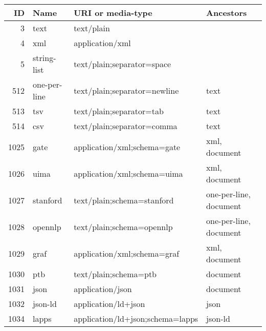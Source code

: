\begin{longtable}{| r | l | l | p{3cm} | }
\hline \multicolumn{1}{|r|}{\textbf{ID}} & \multicolumn{1}{l|}{\textbf{Name}} & \multicolumn{1}{l|}{\textbf{URI or media-type}} & \multicolumn{1}{l|}{\textbf{Ancestors}} \\ \hline
\endhead

3 & text & text/plain &  \\ \hline
4 & xml & application/xml &  \\ \hline
5 & string-list & text/plain;separator=space &  \\ \hline
512 & one-per-line & text/plain;separator=newline & text \\ \hline
513 & tsv & text/plain;separator=tab & text \\ \hline
514 & csv & text/plain;separator=comma & text \\ \hline
1025 & gate & application/xml;schema=gate & xml, document \\ \hline
1026 & uima & application/xml;schema=uima & xml, document \\ \hline
1027 & stanford & text/plain;schema=stanford & one-per-line, document \\ \hline
1028 & opennlp & text/plain;schema=opennlp & one-per-line, document \\ \hline
1029 & graf & application/xml;schema=graf & xml, document \\ \hline
1030 & ptb & text/plain;schema=ptb & document \\ \hline
1031 & json & application/json & document \\ \hline
1032 & json-ld & application/ld+json & json \\ \hline
1034 & lapps & application/ld+json;schema=lapps & json-ld \\ \hline
\end{longtable}
